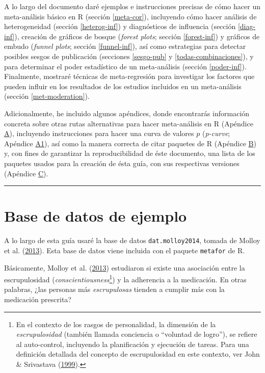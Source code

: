 \documentclass[
  bookmarksnumbered]{article}
\begin{document}
A lo largo del documento daré ejemplos e instrucciones precisas de cómo hacer un meta-análisis básico en R (sección \ref{meta-cor}), incluyendo cómo hacer análisis de heterogeneidad (sección \ref{heterog-inf}) y diagnósticos de influencia (sección \ref{diag-inf}), creación de gráficos de bosque (\emph{forest plots}; sección \ref{forest-inf}) y gráficos de embudo (\emph{funnel plots}; sección \ref{funnel-inf}), así como estrategias para detectar posibles sesgos de publicación (secciones \ref{sesgo-pub} y \ref{todas-combinaciones}), y para determinar el poder estadístico de un meta-análisis (sección \ref{poder-inf}). Finalmente, mostraré técnicas de meta-regresión para investigar los factores que pueden influir en los resultados de los estudios incluidos en un meta-análisis (sección \ref{met-moderation}).

Adicionalmente, he incluido algunos apéndices, donde encontrarás información concreta sobre otras rutas alternativas para hacer meta-análisis en R (Apéndice \hyperlink{apendice-alt}{A}), incluyendo instrucciones para hacer una curva de valores \(p\) (\emph{p-curve}; Apéndice \hyperlink{p-curve}{A1}), así como la manera correcta de citar paquetes de R (Apéndice \hyperlink{paquetes-cit}{B}) y, con fines de garantizar la reproducibilidad de éste documento, una lista de los paquetes usados para la creación de ésta guía, con sus respectivas versiones (Apéndice \hyperlink{paquetes-list}{C}).

\begin{center}\rule{0.5\linewidth}{0.5pt}\end{center}

\hypertarget{base-de-datos-de-ejemplo}{%
\section{Base de datos de ejemplo}\label{base-de-datos-de-ejemplo}}

A lo largo de esta guía usaré la base de datos \texttt{dat.molloy2014}, tomada de Molloy et al. (\protect\hyperlink{ref-molloy2013}{2013}). Esta base de datos viene incluida con el paquete \texttt{metafor} de R.

Básicamente, Molloy et al. (\protect\hyperlink{ref-molloy2013}{2013}) estudiaron si existe una asociación entre la escrupulosidad (\emph{conscientiousness}\footnote{En el contexto de los rasgos de personalidad, la dimensión de la \emph{escrupulosidad} (también llamada conciencia o ``voluntad de logro''), se refiere al auto-control, incluyendo la planificación y ejecución de tareas. Para una definición detallada del concepto de escrupulosidad en este contexto, ver John \& Srivastava (\protect\hyperlink{ref-johnBigFiveTrait1999}{1999}).}) y la adherencia a la medicación. En otras palabras, ¿las personas más \emph{escrupulosas} tienden a cumplir más con la medicación prescrita?
\end{document}
